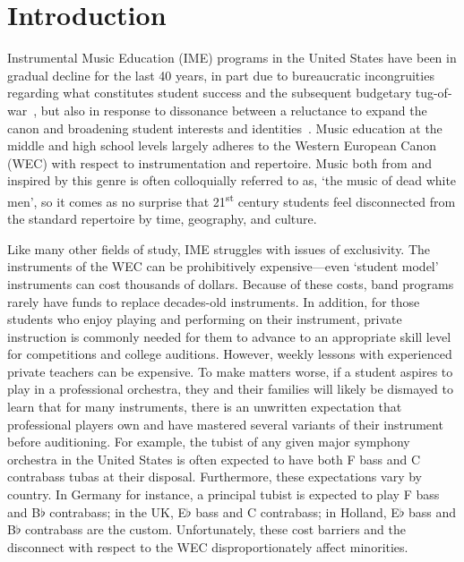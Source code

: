 \documentclass[manuscript,screen,review]{acmart}
\begin{document}
\section{Introduction} 
Instrumental Music Education (IME) programs in the United States have been in gradual decline for the last 40 years, in part due to bureaucratic incongruities regarding what constitutes student success and the subsequent budgetary tug-of-war~\cite{Lehman20}, but also in response to dissonance between a reluctance to expand the canon and broadening student interests and identities~\cite{Vasil23}. Music education at the middle and high school levels largely adheres to the Western European Canon (WEC) with respect to instrumentation and repertoire.
Music both from and inspired by this genre is often colloquially referred to as, `the music of dead white men', so it comes as no surprise that 21\textsuperscript{st} century students feel disconnected from the standard repertoire by time, geography, and culture.

Like many other fields of study, IME struggles with issues of exclusivity.
The instruments of the WEC can be prohibitively expensive---even `student model' instruments can cost thousands of dollars. 
Because of these costs, band programs rarely have funds to replace decades-old instruments.
In addition, for those students who enjoy playing and performing on their instrument, private instruction is commonly needed for them to advance to an appropriate skill level for competitions and college auditions.
However, weekly lessons with experienced private teachers can be expensive.
To make matters worse, if a student aspires to play in a professional orchestra, they and their families will likely be dismayed to learn that for many instruments, there is an unwritten expectation that professional players own and have mastered several variants of their instrument before auditioning.
For example, the tubist of any given major symphony orchestra in the United States is often expected to have both F bass and C contrabass tubas at their disposal.
Furthermore, these expectations vary by country. In Germany for instance, a principal tubist is expected to play F bass and B$\flat$ contrabass;
in the UK, E$\flat$ bass and C contrabass;
in Holland, E$\flat$ bass and B$\flat$ contrabass are the custom.
Unfortunately, these cost barriers and the disconnect with respect to the WEC disproportionately affect minorities. 
\end{document}
